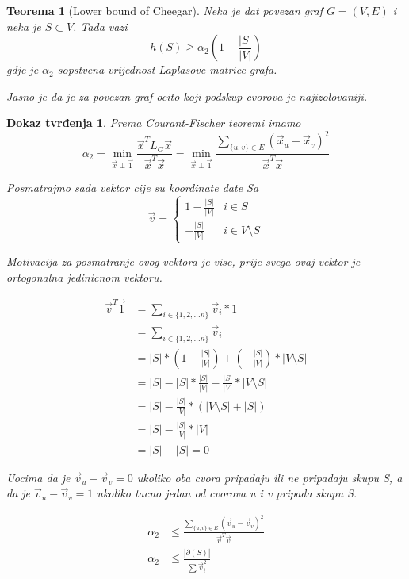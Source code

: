 \documentclass[11pt]{article}
\newtheorem{theorem}{Teorema}
\newtheorem*{custom_proof}{Dokaz tvrđenja}
\begin{document}
    \begin{theorem}[Lower bound of Cheegar]
        Neka je dat povezan graf $G=(V,E)$ i neka je $S \subset V$. Tada vazi
        \[ h(S) \geq \alpha_2 (1 - \frac{|S|}{|V|})\]
        gdje je $\alpha_2$ sopstvena vrijednost Laplasove matrice grafa.

        Jasno je da je za povezan graf ocito koji podskup cvorova je najizolovaniji.
    \end{theorem}

    \begin{custom_proof}
        Prema Courant-Fischer teoremi imamo
        \[
        \alpha_2 = \min_{\vec{x} \perp \vec{1}} \frac{\vec{x}^T L_G \vec{x}}{\vec{x}^T \vec{x}} 
        = \min_{\vec{x} \perp \vec{1}} \frac{ \sum_{\{u,v\} \in E} (\vec{x}_u - \vec{x}_v)^2}{\vec{x}^T \vec{x}}
        \]

        Posmatrajmo sada vektor cije su koordinate date Sa
        \[
            \vec{v} = 
            \begin{cases}
                1 - \frac{|S|}{|V|} & i \in S\\ 
                - \frac{|S|}{|V|} & i \in V \setminus S
            \end{cases}
        \]

        Motivacija za posmatranje ovog vektora je vise, prije svega ovaj vektor je ortogonalna jedinicnom vektoru.

        \[
        \begin{split}
            \vec{v}^T\vec{1} & = \sum_{i \in \{1,2, \dots n\}} \vec{v}_i * 1 \\
            & = \sum_{i \in \{1,2, \dots n\}} \vec{v}_i \\
            & = |S| * (  1 - \frac{|S|}{|V|} ) + ( -\frac{|S|}{|V|}) * |V \setminus S| \\
            & = |S| - |S| * \frac{|S|}{|V|} - \frac{|S|}{|V|} * |V \setminus S| \\
            & = |S| - \frac{|S|}{|V|} * (|V \setminus S| + |S|) \\
            & = |S| - \frac{|S|}{|V|} * |V| \\
            & = |S| - |S| = 0 
        \end{split}
        \]

        Uocima da je $\vec{v}_u - \vec{v}_v = 0$ ukoliko oba cvora pripadaju ili ne pripadaju skupu S, a da je $\vec{v}_u - \vec{v}_v = 1$ ukoliko tacno jedan od cvorova u i v pripada skupu S.
         
        \[
        \begin{split}
            \alpha_2  & \leq \frac{ \sum_{\{u,v\} \in E} (\vec{v}_u - \vec{v}_v)^2}{\vec{v}^T \vec{v}} \\
            \alpha_2  & \leq \frac{ |\partial(S)|}{\sum \vec{v}_i^2} 
        \end{split}
        \]
        

\end{custom_proof}
\end{document}
